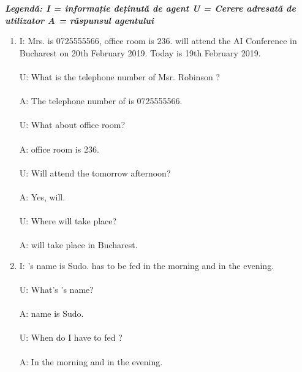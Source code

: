 \documentclass[letterpaper,12pt, dvipsnames, dateno]{article}
\begin{document}
\textbf{\textit{Legendă: I = informație deținută de agent U = Cerere adresată de utilizator A = răspunsul agentului}}


\begin{enumerate}[label=\textbf{\arabic*}]
    \item{ I: Mrs.  is 0725555566,  office room is 236.  will attend the AI Conference in Bucharest on 20th  February 2019. Today is 19th February 2019. \\ \\
           U: What is the telephone number of Msr. Robinson ? \\ \\
           A: The telephone number of  is 0725555566.\\ \\
           U: What about  office room?\\ \\
           A:  office room is 236.\\ \\
           U: Will  attend the  tomorrow afternoon?\\ \\
           A: Yes,   will.\\ \\
           U: Where will   take place?\\ \\
           A:  will take place in Bucharest.
           }
    
    \item{
        I: 's name is Sudo.  has to be fed in the morning and in the evening. \\ \\
        U: What's 's name? \\ \\
        A:  name is Sudo. \\ \\ 
        U: When do I have to fed ? \\ \\
        A: In the morning and in the evening.
        
}
\end{enumerate}
\end{document}
